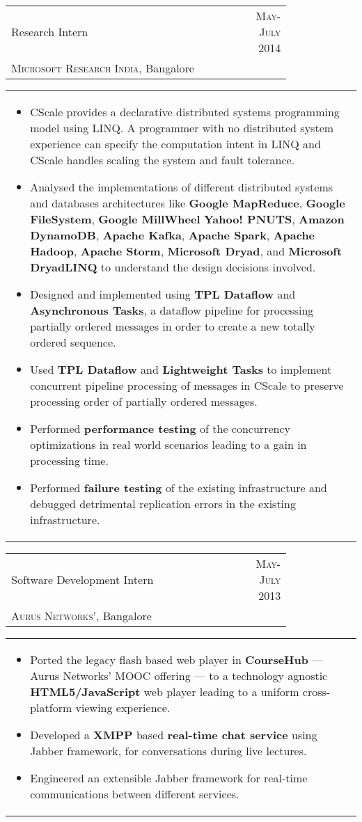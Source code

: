 \documentclass[a4paper,10pt]{article} %
\newcommand{\lproject}[4]{
    \begin{tabular}{p{0.80\linewidth}r}
        \textcolor{NavyBlue}{#2} & \multicolumn{1}{m{4cm}}{\raggedleft \textsc{#1}}\\
        #3
    \end{tabular}
    \begin{tabular}{p{\linewidth}}
    \vspace{-0.3cm}
        \footnotesize{#4}
    \end{tabular}
    \vspace{-0.5cm}
}
\begin{document}
\lproject
    {May-July 2014}
    {Research Intern}
    {\textsc{Microsoft Research India}, Bangalore}
    {
         \begin{itemize}[leftmargin=0.5cm]
             \item CScale provides a declarative distributed systems programming model using LINQ. A programmer with no distributed system
                 experience can specify the computation intent in LINQ and CScale handles scaling the system and fault tolerance.
             \item Analysed the implementations of different distributed systems and databases architectures like
                 \textbf{Google MapReduce}, \textbf{Google FileSystem}, \textbf{Google MillWheel} \textbf{Yahoo! PNUTS},
                 \textbf{Amazon DynamoDB}, \textbf{Apache Kafka}, \textbf{Apache Spark}, \textbf{Apache Hadoop}, \textbf{Apache Storm},
                 \textbf{Microsoft Dryad}, and \textbf{Microsoft DryadLINQ} to understand the design decisions involved.
             \item Designed and implemented using \textbf{TPL Dataflow} and \textbf{Asynchronous Tasks}, a dataflow pipeline for
                 processing partially ordered messages in order to create a new totally ordered sequence.
             \item Used \textbf{TPL Dataflow} and \textbf{Lightweight Tasks} to implement concurrent pipeline processing of messages in
                 CScale to preserve processing order of partially ordered messages.
             \item Performed \textbf{performance testing} of the concurrency optimizations in real world scenarios leading to a gain in processing time.
             \item Performed \textbf{failure testing} of the existing infrastructure and debugged detrimental replication errors in the
                 existing infrastructure.
         \end{itemize}
     }

\lproject
    {May-July 2013}
    {Software Development Intern}
    {\textsc{Aurus Networks'}, Bangalore}
    {
        \begin{itemize}[leftmargin=0.5cm]
            \item Ported the legacy flash based web player in \textbf{CourseHub} --- Aurus Networks' MOOC offering --- to a technology agnostic
                \textbf{HTML5/JavaScript} web player leading to a uniform cross-platform viewing experience.
            \item Developed a \textbf{XMPP} based \textbf{real-time chat service} using Jabber framework, for conversations during live lectures.
            \item Engineered an extensible Jabber framework for real-time communications between different services.
        \end{itemize}
    }
\end{document}
